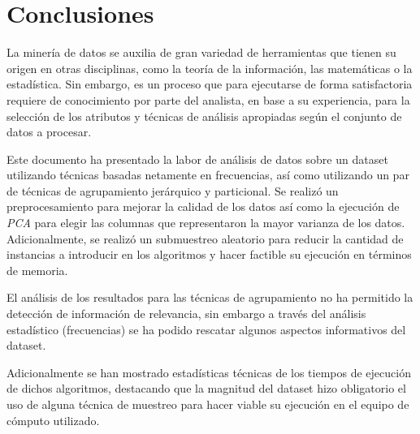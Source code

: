 \documentclass[12pt]{article}
\numberwithin{equation}{section}
\numberwithin{table}{section}
\numberwithin{figure}{section}
\begin{document}
\section{Conclusiones}
La minería de datos se auxilia de gran variedad de herramientas que tienen su origen en otras disciplinas, como la teoría de la información, las matemáticas o la estadística. Sin embargo, es un proceso que para ejecutarse de forma satisfactoria requiere de conocimiento por parte del analista, en base a su experiencia, para la selección de los atributos y técnicas de análisis apropiadas según el conjunto de datos a procesar.

Este documento ha presentado la labor de análisis de datos sobre un dataset utilizando técnicas basadas netamente en frecuencias, así como utilizando un par de técnicas de agrupamiento jerárquico y particional.
Se realizó un preprocesamiento para mejorar la calidad de los datos así como la ejecución de \emph{PCA} para elegir las columnas que representaron la mayor varianza de los datos. Adicionalmente, se realizó un submuestreo aleatorio para reducir la cantidad de instancias a introducir en los algoritmos y hacer factible su ejecución en términos de memoria.

El análisis de los resultados para las técnicas de agrupamiento no ha permitido la detección de información de relevancia, sin embargo a través del análisis estadístico (frecuencias) se ha podido rescatar algunos aspectos informativos del dataset.

Adicionalmente se han mostrado estadísticas técnicas de los tiempos de ejecución de dichos algoritmos, destacando que la magnitud del dataset hizo obligatorio el uso de alguna técnica de muestreo para hacer viable su ejecución en el equipo de cómputo utilizado.
\end{document}
